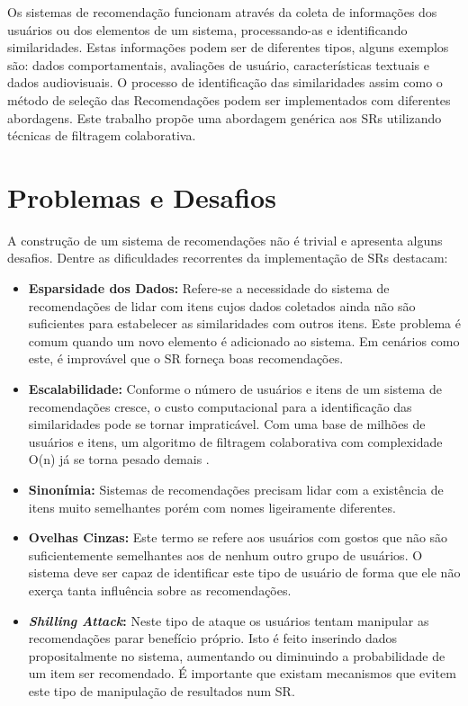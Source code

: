 \documentclass[
	12pt,				%
    oneside,			%
	a4paper,			%
	english,			%
	french,				%
	spanish,			%
	brazil,				%
	]{abntex2}
\begin{document}
Os sistemas de recomendação funcionam através da coleta de informações dos usuários ou dos elementos de um sistema, processando-as e 
identificando similaridades. Estas informações podem ser de diferentes tipos, alguns exemplos são: dados comportamentais, avaliações de usuário,
características textuais e dados audiovisuais. O processo de identificação das similaridades assim como o método de seleção das Recomendações podem 
ser implementados com diferentes abordagens. Este trabalho propõe uma abordagem genérica aos SRs utilizando técnicas de filtragem colaborativa.

\section{Problemas e Desafios}
A construção de um sistema de recomendações não é trivial e apresenta alguns desafios. Dentre as dificuldades recorrentes da 
implementação de SRs  destacam:

\begin{itemize}
	\item \textbf{Esparsidade dos Dados:} Refere-se a necessidade do sistema de recomendações de lidar com itens cujos dados coletados ainda não são
	suficientes para estabelecer as similaridades com outros itens. Este problema é comum quando um novo elemento é adicionado ao sistema. Em cenários
	como este, é improvável que o SR forneça boas recomendações.
	\item \textbf{Escalabilidade:} Conforme o número de usuários e itens de um sistema de recomendações cresce, o custo computacional para a identificação
	das similaridades pode se tornar impraticável. Com uma base de milhões de usuários e itens, um algoritmo de filtragem colaborativa com complexidade O(n)
	já se torna pesado demais \cite{2-CFSurvey}. 
	\item \textbf{Sinonímia:} Sistemas de recomendações precisam lidar com a existência de itens muito semelhantes porém com nomes ligeiramente diferentes.
	\item \textbf{Ovelhas Cinzas:} Este termo se refere aos usuários com gostos que não são suficientemente semelhantes aos de nenhum outro grupo de usuários. O sistema deve
	ser capaz de identificar este tipo de usuário de forma que ele não exerça tanta influência sobre as recomendações.
	\item \textbf{\textit{Shilling Attack}:} Neste tipo de ataque os usuários tentam manipular as recomendações parar benefício
	próprio. Isto é feito inserindo dados propositalmente no sistema, aumentando ou diminuindo a probabilidade de um item ser recomendado. É importante que existam
	mecanismos que evitem este tipo de manipulação de resultados num SR.
\end{itemize}
\end{document}
